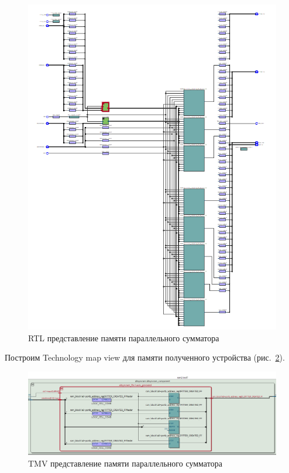 \documentclass[a4paper,14pt]{article}
\begin{document}
\begin{figure}[H]
	\centering
	\includegraphics[width=\linewidth]{image/z2_rtl}
	\caption{RTL представление памяти параллельного сумматора}
	\label{fig:z2_rtl}
\end{figure}

Построим Technology map view для памяти полученного устройства (рис.~\ref{fig:z2_rtl2}).

\begin{figure}[H]
	\centering
	\includegraphics[width=\linewidth]{image/z2_rtl2}
	\caption{TMV представление памяти параллельного сумматора}
	\label{fig:z2_rtl2}
\end{figure}
\end{document}
